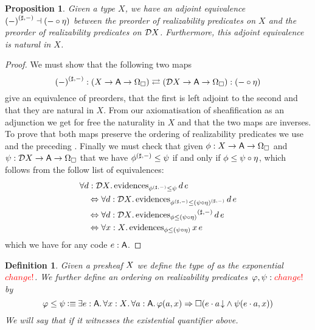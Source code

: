 \documentclass[11pt]{article}
\newtheorem{prop}[thrm]{Proposition}
\newtheorem{defn}[thrm]{Definition}
\begin{document}
\begin{prop}
  Given a type \(X\), we have an adjoint equivalence
  \({(-)}^{({\sharp,-})} \dashv (-\circ\eta)\)
  between the preorder of realizability predicates on \(X\)
  and the preorder of realizability predicates on \(\mathcal{D}{X}\).
  Furthermore, this adjoint equivalence is natural in \(X\).
\end{prop}
\begin{proof}
  We must show that the following two maps
  \[
    {(-)}^{({\sharp,-})} : {({{X}\to{{{\ensuremath{\mathsf{A}}}\to{\Omega_\Box}}}})} \rightleftarrows {({{\mathcal{D}{X}}\to{{{\ensuremath{\mathsf{A}}}\to{\Omega_\Box}}}})} : (-\circ\eta)
  \]
  give an equivalence of preorders, that the first is left adjoint to the
  second and that they are natural in \(X\).
  From our axiomatisation of sheafification as an adjunction we get
  for free the naturality in \(X\) and that the two maps are inverses.
  To prove that both maps preserve the ordering of realizability predicates
  we use  and
  the preceding .
  Finally we must check that given \(\phi : {{X}\to{{{\ensuremath{\mathsf{A}}}\to{\Omega_\Box}}}}\)
  and \(\psi : {{\mathcal{D}{X}}\to{{{\ensuremath{\mathsf{A}}}\to{\Omega_\Box}}}}\) that we have
  \({\phi}^{({\sharp,-})}\leq\psi\) if and only if \(\phi \leq \psi\circ\eta\),
  which follows from the follow list of equivalences:
  \begin{align*}
    &
      \forall{d:\mathcal{D}{X}}.\,{\text{evidences}_{{{\phi}^{({\sharp,-})}}\leq{\psi}}\,d\,e}
    \\
    &\quad\Leftrightarrow
      \forall{d:\mathcal{D}{X}}.\,{\text{evidences}_{{{\phi}^{({\sharp,-})}}\leq{{(\psi\circ\eta)}^{({\sharp,-})}}}\,d\,e}
    \\
    &\quad\Leftrightarrow
      \forall{d:\mathcal{D}{X}}.\,{{\text{evidences}_{{\phi}\leq{(\psi\circ\eta)}}}^{({\sharp,-})}\,d\,e}
    \\
    &\quad\Leftrightarrow
      \forall{x:X}.\,{\text{evidences}_{{\phi}\leq{(\psi\circ\eta)}}\,x\,e}
  \end{align*}
  which we have for any code \(e:\mathsf{A}\).
\end{proof}

\newpage

\begin{defn}\label{defn:tripos-predicates-and-ordering}
  Given a presheaf \(X\) we define the type of  as the exponential \({\color{red}change!}\).
  We further define an ordering on realizability
  predicates~\(\varphi, \psi : {\color{red}change!}\) by
  \[
    \varphi \leq \psi
    \IsDefined
    \IExists{e : \A}{
      \IForall{x : \X}{
        \IForall{a : \A}{
          \IImplies%
            {\varphi(a,x)}%
            {\IBox{(
              \IAnd%
              {\ITotal{\IAp{e}{a}}}%
              {\psi(\IAp{e}{a}, x)}
            )}}
        }
      }
    }
  \]
  We will say that  if
  it witnesses the existential quantifier above.
\end{defn}
\end{document}
